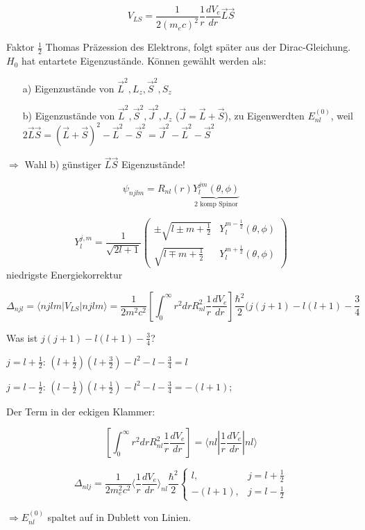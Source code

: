 \[ V_{LS}=\frac{1}{2(m_ec)^2}\frac{1}{r}\frac{dV_e}{dr}\vec L \vec S\]

Faktor \(\frac{1}{2}\) Thomas Präzession des Elektrons, folgt später aus der Dirac-Gleichung. \(H_0\) hat entartete Eigenzustände. Können gewählt werden als:
\begin{itemize}
\item[a)] Eigenzustände von \(\vec L^2,L_z,\vec S^2,S_z\)
\item[b)] Eigenzustände von \(\vec L^2,\vec S^2,\vec J^2,J_z\) (\(\vec J = \vec L + \vec S\)), zu Eigenwerdten \(E^{(0)}_{nl}\), weil \(2\vec L\vec S = (\vec L + \vec S)^2-\vec L^2-\vec S^2 = \vec J^2 - \vec L^2 - \vec S^2\)
\end{itemize}

\(\Rightarrow\) Wahl b) günstiger \(\vec L\vec S\) Eigenzustände!

\[ \psi_{njlm} = R_{nl}(r)\underbrace{Y^{jm}_l (\theta,\phi)}_{\text{2 komp Spinor}}\]

\[ Y^{j,m}_l = \frac{1}{\sqrt{2l+1}}\begin{pmatrix} 
  \pm\sqrt{l\pm m+\frac{1}{2}} & Y^{m-\frac{1}{2}}_l(\theta,\phi) \\
  \sqrt{l\mp m+\frac{1}{2}} & Y^{m+\frac{1}{2}}_l(\theta,\phi)
\end{pmatrix}
\]
niedrigste Energiekorrektur

\[ \Delta_{njl} = \langle njlm | V_{LS} | njlm\rangle = \frac{1}{2m^2c^2}\left[ \int^\infty_0 r^2 dr R^2_{nl}\frac{1}{r}\frac{dV_e}{dr} \right] \frac{\hbar^2}{2} (j(j+1)-l(l+1)-\frac{3}{4}\]

Was ist \(j(j+1)-l(l+1)-\frac{3}{4}\)?

\(j=l+\frac{1}{2}\): \((l+\frac{1}{2})(l+\frac{3}{2})-l^2-l-\frac{3}{4} = l\)

\(j=l-\frac{1}{2}\): \((l-\frac{1}{2})(l+\frac{1}{2})-l^2-l-\frac{3}{4} = -(l+1)\);

Der Term in der eckigen Klammer:

 \[\left[ \int^\infty_0 r^2 dr R^2_{nl}\frac{1}{r}\frac{dV_e}{dr} \right]=\langle nl| \frac{1}{r}\frac{dV_e}{dr}|nl \rangle\]

\[ \Delta_{nlj} = \frac{1}{2m^2_e c^2}\langle \frac{1}{r}\frac{dV_e}{dr}\rangle_{nl}\frac{\hbar^2}{2}\begin{cases}
  l,  & j=l+\frac{1}{2}\\
  -(l+1), & j=l-\frac{1}{2}
\end{cases} \]

\(\Rightarrow E^{(0)}_{nl}\) spaltet auf in Dublett von Linien.

